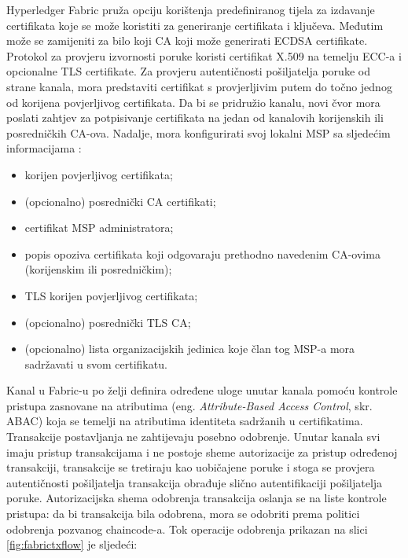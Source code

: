\documentclass[times, utf8, diplomski]{fer}
\begin{document}
Hyperledger Fabric pruža opciju korištenja predefiniranog tijela za izdavanje certifikata koje se može koristiti za generiranje certifikata i ključeva. Međutim može se zamijeniti za bilo koji CA koji može generirati ECDSA certifikate. Protokol za provjeru izvornosti poruke koristi certifikat X.509 na temelju ECC-a \cite{lagarde2019security} i opcionalne TLS certifikate. Za provjeru autentičnosti pošiljatelja poruke od strane kanala, mora predstaviti certifikat s provjerljivim putem do točno jednog od korijena povjerljivog certifikata.  Da bi se pridružio kanalu, novi čvor mora poslati zahtjev za potpisivanje certifikata na jedan od kanalovih korijenskih ili posredničkih CA-ova. Nadalje, mora konfigurirati svoj lokalni MSP sa sljedećim informacijama \cite{lagarde2019security}:

\begin{itemize}

\item korijen povjerljivog certifikata;

\item (opcionalno) posrednički CA certifikati;

\item certifikat MSP administratora;

\item popis opoziva certifikata koji odgovaraju prethodno navedenim CA-ovima (korijenskim ili posredničkim);

\item TLS korijen povjerljivog certifikata;

\item (opcionalno) posrednički TLS CA;

\item (opcionalno) lista organizacijskih jedinica koje član tog MSP-a mora sadržavati u svom certifikatu.

\end{itemize}

Kanal u Fabric-u po želji definira određene uloge unutar kanala pomoću kontrole pristupa zasnovane na atributima (eng. \textit{Attribute-Based Access Control}, skr. ABAC) koja se temelji na atributima identiteta sadržanih u certifikatima. Transakcije postavljanja ne zahtijevaju posebno odobrenje. Unutar kanala svi imaju pristup transakcijama i ne postoje sheme autorizacije za pristup određenoj transakciji, transakcije se tretiraju kao uobičajene poruke i stoga se provjera autentičnosti pošiljatelja transakcija obrađuje slično autentifikaciji pošiljatelja poruke. Autorizacijska shema odobrenja transakcija oslanja se na liste kontrole pristupa: da bi transakcija bila odobrena, mora se odobriti prema politici odobrenja pozvanog chaincode-a. Tok operacije odobrenja prikazan na slici \ref{fig:fabrictxflow} je sljedeći:
\end{document}

